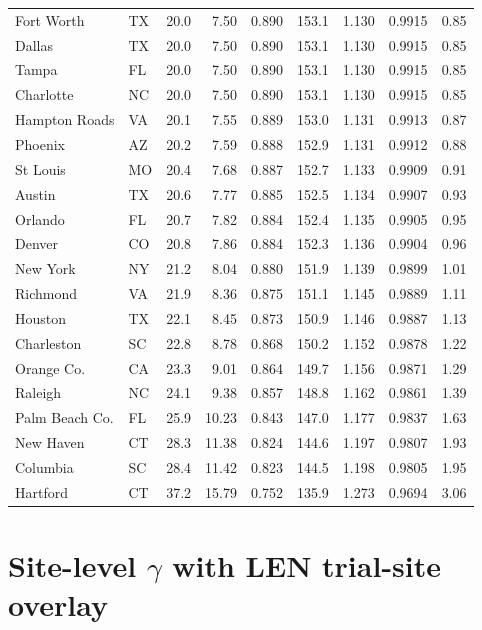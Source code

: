 \documentclass[11pt]{article}
\begin{document}
\begin{longtable}{@{}llcrrrrrr@{}}
Fort Worth & TX & 20.0 & 7.50 & 0.890 & 153.1 & 1.130 & 0.9915 & 0.85 \\
Dallas & TX & 20.0 & 7.50 & 0.890 & 153.1 & 1.130 & 0.9915 & 0.85 \\
Tampa & FL & 20.0 & 7.50 & 0.890 & 153.1 & 1.130 & 0.9915 & 0.85 \\
Charlotte & NC & 20.0 & 7.50 & 0.890 & 153.1 & 1.130 & 0.9915 & 0.85 \\
Hampton Roads & VA & 20.1 & 7.55 & 0.889 & 153.0 & 1.131 & 0.9913 & 0.87 \\
Phoenix & AZ & 20.2 & 7.59 & 0.888 & 152.9 & 1.131 & 0.9912 & 0.88 \\
St Louis & MO & 20.4 & 7.68 & 0.887 & 152.7 & 1.133 & 0.9909 & 0.91 \\
Austin & TX & 20.6 & 7.77 & 0.885 & 152.5 & 1.134 & 0.9907 & 0.93 \\
Orlando & FL & 20.7 & 7.82 & 0.884 & 152.4 & 1.135 & 0.9905 & 0.95 \\
Denver & CO & 20.8 & 7.86 & 0.884 & 152.3 & 1.136 & 0.9904 & 0.96 \\
New York & NY & 21.2 & 8.04 & 0.880 & 151.9 & 1.139 & 0.9899 & 1.01 \\
Richmond & VA & 21.9 & 8.36 & 0.875 & 151.1 & 1.145 & 0.9889 & 1.11 \\
Houston & TX & 22.1 & 8.45 & 0.873 & 150.9 & 1.146 & 0.9887 & 1.13 \\
Charleston & SC & 22.8 & 8.78 & 0.868 & 150.2 & 1.152 & 0.9878 & 1.22 \\
Orange Co. & CA & 23.3 & 9.01 & 0.864 & 149.7 & 1.156 & 0.9871 & 1.29 \\
Raleigh & NC & 24.1 & 9.38 & 0.857 & 148.8 & 1.162 & 0.9861 & 1.39 \\
Palm Beach Co. & FL & 25.9 & 10.23 & 0.843 & 147.0 & 1.177 & 0.9837 & 1.63 \\
New Haven & CT & 28.3 & 11.38 & 0.824 & 144.6 & 1.197 & 0.9807 & 1.93 \\
Columbia & SC & 28.4 & 11.42 & 0.823 & 144.5 & 1.198 & 0.9805 & 1.95 \\
Hartford & CT & 37.2 & 15.79 & 0.752 & 135.9 & 1.273 & 0.9694 & 3.06 \\
\end{longtable}
\normalsize
\setlength{\tabcolsep}{6pt}
\renewcommand{\arraystretch}{1.0}

\section{Site-level \texorpdfstring{$\gamma$}{gamma} with LEN trial-site overlay}\label{sec:sitelevel}
\end{document}
